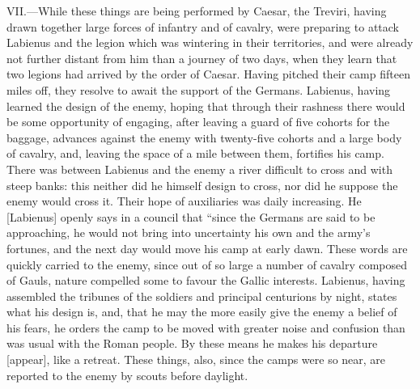 VII.—While these things are being performed by Caesar, the Treviri,
having drawn together large forces of infantry and of cavalry, were
preparing to attack Labienus and the legion which was wintering in their
territories, and were already not further distant from him than a
journey of two days, when they learn that two legions had arrived by the
order of Caesar. Having pitched their camp fifteen miles off, they
resolve to await the support of the Germans. Labienus, having learned
the design of the enemy, hoping that through their rashness there would
be some opportunity of engaging, after leaving a guard of five cohorts
for the baggage, advances against the enemy with twenty-five cohorts and
a large body of cavalry, and, leaving the space of a mile between them,
fortifies his camp. There was between Labienus and the enemy a river
difficult to cross and with steep banks: this neither did he himself
design to cross, nor did he suppose the enemy would cross it. Their hope
of auxiliaries was daily increasing. He [Labienus] openly says in a
council that ``since the Germans are said to be approaching, he would not
bring into uncertainty his own and the army's fortunes, and the next day
would move his camp at early dawn. These words are quickly carried to
the enemy, since out of so large a number of cavalry composed of Gauls,
nature compelled some to favour the Gallic interests. Labienus, having
assembled the tribunes of the soldiers and principal centurions by
night, states what his design is, and, that he may the more easily give
the enemy a belief of his fears, he orders the camp to be moved with
greater noise and confusion than was usual with the Roman people. By
these means he makes his departure [appear], like a retreat. These
things, also, since the camps were so near, are reported to the enemy by
scouts before daylight.


